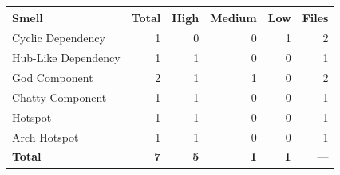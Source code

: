\begin{tabular}{l|r|r|r|r|r}
\hline
\textbf{Smell} & \textbf{Total} & \textbf{High} & \textbf{Medium} & \textbf{Low} & \textbf{Files} \\
\hline
Cyclic Dependency & 1 & 0 & 0 & 1 & 2 \\
Hub-Like Dependency & 1 & 1 & 0 & 0 & 1 \\
God Component & 2 & 1 & 1 & 0 & 2 \\
Chatty Component & 1 & 1 & 0 & 0 & 1 \\
Hotspot & 1 & 1 & 0 & 0 & 1 \\
Arch Hotspot & 1 & 1 & 0 & 0 & 1 \\
\hline
\textbf{Total}       & \textbf{7} & \textbf{5} & \textbf{1} & \textbf{1} & --- \\
\hline
\end{tabular}